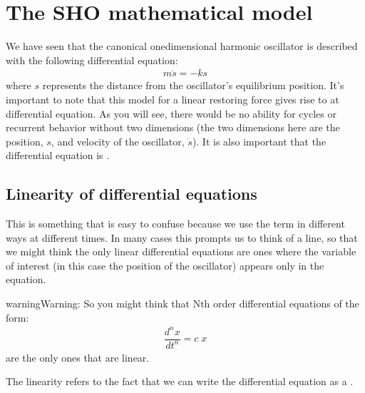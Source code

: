 \documentclass[letterpaper,10pt,english]{jupyterBook}
\begin{document}
\section{The SHO mathematical model}
\label{\detokenize{content/1_mechanics/sho/notes-SHO:the-sho-mathematical-model}}
\sphinxAtStartPar
We have seen that the canonical one\sphinxhyphen{}dimensional harmonic oscillator is described with the following  differential equation:
\begin{equation*}
\begin{split}m\ddot{s} = -k{s}\end{split}
\end{equation*}
\sphinxAtStartPar
where \(s\) represents the distance from the oscillator’s equilibrium position. It’s important to note that this model for a linear restoring force gives rise to at  differential equation. As you will see, there would be no ability for cycles or recurrent behavior without two dimensions (the two dimensions here are the position, \(s\), and velocity of the oscillator, \(\dot{s}\)). It is also important that the differential equation is .


\subsection{Linearity of differential equations}
\label{\detokenize{content/1_mechanics/sho/notes-SHO:linearity-of-differential-equations}}
\sphinxAtStartPar
This is something that is easy to confuse because we use the term  in different ways at different times. In many cases this prompts us to think of a line, so that we might think the only linear differential equations are ones where the variable of interest (in this case the position of the oscillator) appears only  in the equation.

\begin{sphinxadmonition}{warning}{Warning:}
\sphinxAtStartPar
So you might think that Nth order differential equations of the form:
\begin{equation*}
\begin{split}\dfrac{d^n x}{dt^n} = c\;x\end{split}
\end{equation*}
\sphinxAtStartPar
are the only ones that are linear. 

\sphinxAtStartPar
{}

\sphinxAtStartPar
The linearity refers to the fact that we can write the differential equation as a .
\end{sphinxadmonition}
\end{document}
